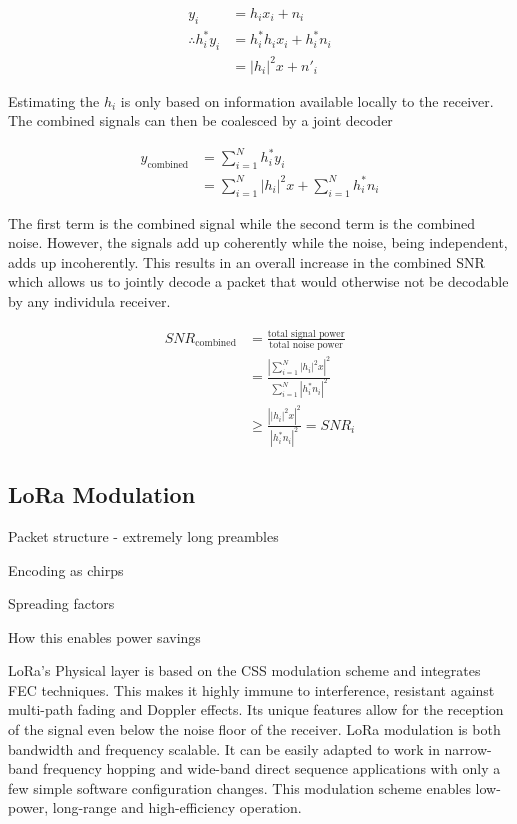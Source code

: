 \begin{align*}
y_i &= h_i x_i + n_i \\
\therefore h^*_i y_i &= h^*_i h_i x_i + h^*_i n_i \\
	&= \left| h_i \right|^2 x + n'_i
\end{align*}

Estimating the $h_i$ is only based on information available locally to the
receiver. The combined signals can then be coalesced by a joint decoder

\begin{align*}
y_{\text{combined}}
	&= \sum_{i=1}^N h^*_i y_i \\
	&= \sum_{i=1}^N \left| h_i \right|^2 x + \sum_{i=1}^N h^*_i n_i
\end{align*}

The first term is the combined signal while the second term is the combined
noise. However, the signals add up coherently while the noise, being
independent, adds up incoherently. This results in an overall increase in the
combined SNR which allows us to jointly decode a packet that would otherwise
not be decodable by any individula receiver.

\begin{align*}
SNR_{\text{combined}} &= \frac{\text{total signal power}}{\text{total noise power}} \\
	&= \frac{\left| \sum_{i=1}^N \left| h_i \right|^2 x \right|^2}{\sum_{i=1}^N \left| h^*_i n_i \right|^2} \\
	&\geq \frac{\left| \left| h_i \right|^2 x \right|^2}{\left| h^*_i n_i \right|^2} = SNR_i
\end{align*}

\subsection{LoRa Modulation}
\label{sec:lora}

{\color{blue}
Packet structure - extremely long preambles

Encoding as chirps

Spreading factors

How this enables power savings
}

\ac{LoRa}'s Physical layer is based on the \ac{CSS} modulation scheme and
integrates \ac{FEC} techniques. This makes it highly immune to interference,
resistant against multi-path fading and Doppler effects. Its unique features
allow for the reception of the signal even below the noise floor of the
receiver.
\ac{LoRa} modulation is both bandwidth and frequency scalable.
It can be easily adapted to work in narrow-band frequency hopping and wide-band direct sequence applications with only a few simple software configuration changes.
This modulation scheme enables low-power, long-range and high-efficiency operation.

